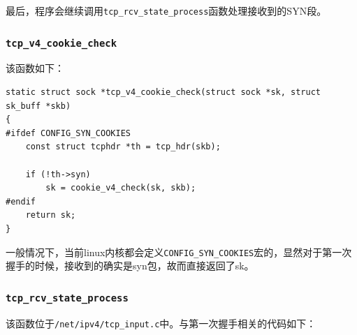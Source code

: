                 最后，程序会继续调用\texttt{tcp_rcv_state_process}函数处理接收到的SYN段。
            
            \subsubsection{\texttt{tcp_v4_cookie_check}}
                该函数如下：
\begin{verbatim}
static struct sock *tcp_v4_cookie_check(struct sock *sk, struct sk_buff *skb)
{
#ifdef CONFIG_SYN_COOKIES
    const struct tcphdr *th = tcp_hdr(skb);

    if (!th->syn)
        sk = cookie_v4_check(sk, skb);
#endif
    return sk;
}
\end{verbatim}

                一般情况下，当前linux内核都会定义\texttt{CONFIG_SYN_COOKIES}宏的，显然对于第一次握手的时候，接收到的确实是syn包，故而直接返回了sk。
            \subsubsection{\texttt{tcp_rcv_state_process}}
                该函数位于\texttt{/net/ipv4/tcp_input.c}中。与第一次握手相关的代码如下：

